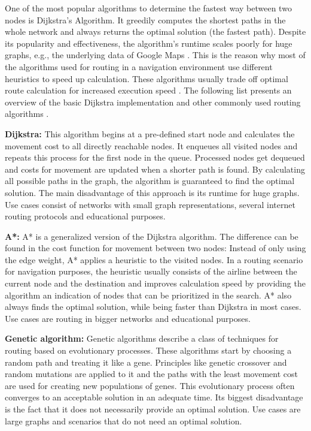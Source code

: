 One of the most popular algorithms to determine the fastest way between two nodes is Dijkstra's Algorithm. It greedily computes the shortest paths in the whole network and always returns the optimal solution (the fastest path). Despite its popularity and effectiveness, the algorithm's runtime scales poorly for huge graphs, e.g., the underlying data of Google Maps \cite{google_maps}. This is the reason why most of the algorithms used for routing in a navigation environment use different heuristics to speed up calculation. These algorithms usually trade off optimal route calculation for increased execution speed \cite{routing_algorithms}. The following list presents an overview of the basic Dijkstra implementation and other commonly used routing algorithms \cite{routing_algorithms}.

\textbf{Dijkstra:} This algorithm begins at a pre-defined start node and calculates the movement cost to all directly reachable nodes. It enqueues all visited nodes and repeats this process for the first node in the queue. Processed nodes get dequeued and costs for movement are updated when a shorter path is found. By calculating all possible paths in the graph, the algorithm is guaranteed to find the optimal solution. The main disadvantage of this approach is its runtime for huge graphs. Use cases consist of networks with small graph representations, several internet routing protocols and educational purposes.

\textbf{A*:} A* is a generalized version of the Dijkstra algorithm. The difference can be found in the cost function for movement between two nodes: Instead of only using the edge weight, A* applies a heuristic to the visited nodes. In a routing scenario for navigation purposes, the heuristic usually consists of the airline between the current node and the destination and improves calculation speed by providing the algorithm an indication of nodes that can be prioritized in the search. A* also always finds the optimal solution, while being faster than Dijkstra in most cases. Use cases are routing in bigger networks and educational purposes.

\textbf{Genetic algorithm:} Genetic algorithms describe a class of techniques for routing based on evolutionary processes. These algorithms start by choosing a random path and treating it like a gene. Principles like genetic crossover and random mutations are applied to it and the paths with the least movement cost are used for creating new populations of genes. This evolutionary process often converges to an acceptable solution in an adequate time. Its biggest disadvantage is the fact that it does not necessarily provide an optimal solution. Use cases are large graphs and scenarios that do not need an optimal solution.

